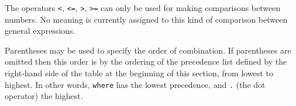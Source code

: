 The operators \texttt{<}, \texttt{<=}, \texttt{>}, \texttt{>=}
can only be used for making comparisons between numbers.  No meaning is
currently assigned to this kind of comparison between general expressions.

Parentheses may be used to specify the order of combination.  If
parentheses are omitted then this order is by the ordering of the
precedence list
defined by the right-hand side
of the  table
at the beginning of this section,
from lowest to highest.  In other words, \texttt{where} has the lowest
precedence, and \texttt{.} (the dot operator) the highest.
